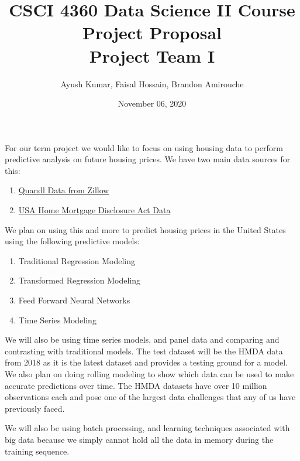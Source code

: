 \documentclass{article}
\title{CSCI 4360 Data Science II Course Project Proposal\\
		Project Team I}
\author{Ayush Kumar, Faisal Hossain, Brandon Amirouche}
\date{November 06, 2020}
\begin{document}
	
	\maketitle
	
	For our term project we would like to focus on using housing data to perform predictive 
	analysis on future housing prices. We have two main data sources for this: 
	
	\begin{enumerate}
		\item  \href{https://www.quandl.com/databases/ZILLOW/data}{Quandl Data from Zillow}
		\item \href{https://www.consumerfinance.gov/data-research/hmda/historic-data/?geo=nationwide&records=all-records&field_descriptions=labels}{USA Home Mortgage Disclosure Act Data}
	\end{enumerate}
	
	We plan on using this and more to predict housing prices in the United States using the following predictive models: 
	
	\begin{enumerate}
		\item Traditional Regression Modeling 
		\item Transformed Regression Modeling 
		\item Feed Forward Neural Networks 
		\item Time Series Modeling
	\end{enumerate}

	We will also be using time series models, and panel data and comparing and contrasting with traditional models. The test dataset will be the HMDA data from 2018 as it is the latest dataset and provides a testing ground for a model. We also plan on doing rolling modeling to show which data can be used to make 
	accurate predictions over time. The HMDA datasets have over 10 million observations each and pose one of the largest data challenges that any of us have previously faced. 
	
	We will also be using batch processing, and learning techniques associated with big data because we simply cannot hold all the data in memory during the training sequence. 
\end{document}
